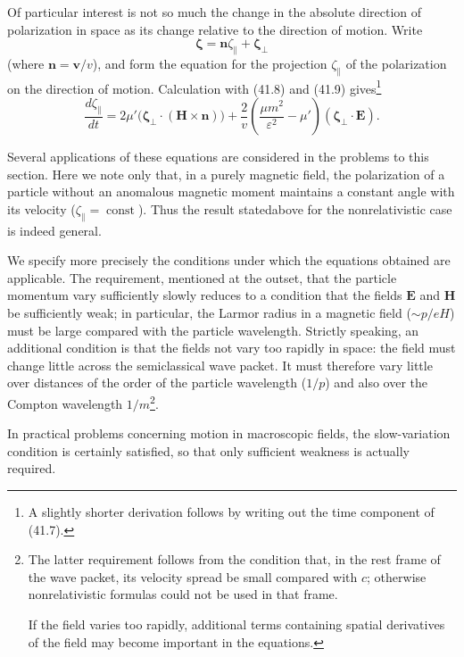 Of particular interest is not so much the change in the absolute direction of polarization in space as its change relative to the direction of motion. Write
\begin{equation}
\boldsymbol\zeta=\mathbf n\zeta_\parallel+\boldsymbol\zeta_\perp
\tag{41.10}
\end{equation}
(where $\mathbf n=\mathbf v/v$), and form the equation for the projection $\zeta_\parallel$ of the polarization on the direction of motion. Calculation with (41.8) and (41.9) gives\footnote{A slightly shorter derivation follows by writing out the time component of (41.7).}
\begin{equation}
\frac{d\zeta_\parallel}{dt}
=2\mu'\bigl(\boldsymbol\zeta_\perp\cdot(\mathbf H\times\mathbf n)\bigr)
+\frac2v\left(\frac{\mu m^2}{\varepsilon^2}-\mu'\right)
(\boldsymbol\zeta_\perp\cdot\mathbf E).
\tag{41.11}
\end{equation}

Several applications of these equations are considered in the problems to this section. Here we note only that, in a purely magnetic field, the polarization of a particle without an anomalous magnetic moment maintains a constant angle with its velocity ($\zeta_\parallel=\operatorname{const}$). Thus the result statedabove for the nonrelativistic case is indeed general.

We specify more precisely the conditions under which the equations obtained are applicable. The requirement, mentioned at the outset, that the particle momentum vary sufficiently slowly reduces to a condition that the fields $\mathbf E$ and $\mathbf H$ be sufficiently weak; in particular, the Larmor radius in a magnetic field ($\sim p/eH$) must be large compared with the particle wavelength. Strictly speaking, an additional condition is that the fields not vary too rapidly in space: the field must change little across the semiclassical wave packet. It must therefore vary little over distances of the order of the particle wavelength ($1/p$) and also over the Compton wavelength $1/m$\footnote{The latter requirement follows from the condition that, in the rest frame of the wave packet, its velocity spread be small compared with $c$; otherwise nonrelativistic formulas could not be used in that frame.

If the field varies too rapidly, additional terms containing spatial derivatives of the field may become important in the equations.}.

In practical problems concerning motion in macroscopic fields, the slow-variation condition is certainly satisfied, so that only sufficient weakness is actually required.

